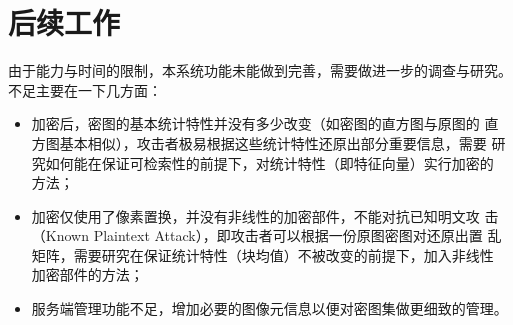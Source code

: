 \section{后续工作}
\label{sec:next-step}

由于能力与时间的限制，本系统功能未能做到完善，需要做进一步的调查与研究。
不足主要在一下几方面：
\begin{itemize}
\item 加密后，密图的基本统计特性并没有多少改变（如密图的直方图与原图的
  直方图基本相似），攻击者极易根据这些统计特性还原出部分重要信息，需要
  研究如何能在保证可检索性的前提下，对统计特性（即特征向量）实行加密的
  方法；
\item 加密仅使用了像素置换，并没有非线性的加密部件，不能对抗已知明文攻
  击（Known Plaintext Attack），即攻击者可以根据一份原图密图对还原出置
  乱矩阵，需要研究在保证统计特性（块均值）不被改变的前提下，加入非线性
  加密部件的方法；
\item 服务端管理功能不足，增加必要的图像元信息以便对密图集做更细致的管理。
\end{itemize}
